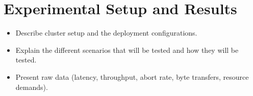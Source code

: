 \section{Experimental Setup and Results}
\label{sec: experimental-setup-and-results}

\begin{itemize}
    \item Describe cluster setup and the deployment configurations.
    \item Explain the different scenarios that will be tested and how they will be tested.
    \item Present raw data (latency, throughput, abort rate, byte transfers, resource demands).
\end{itemize}